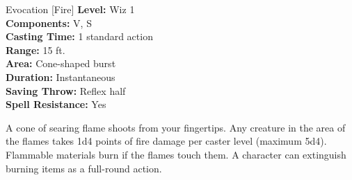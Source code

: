 {Evocation [Fire]}
{
	\textbf{Level:}
	Wiz 1\\
	\textbf{Components:}
	V, S\\
	\textbf{Casting Time:}
	1 standard action\\
	\textbf{Range:}
	15 ft.\\
	\textbf{Area:}
	Cone-shaped burst\\
	\textbf{Duration:}
	Instantaneous\\
	\textbf{Saving Throw:}
	Reflex half\\
	\textbf{Spell Resistance:}
	Yes\\
}
{
	A cone of searing flame shoots from your fingertips. Any creature in the area of the flames takes 1d4 points of fire damage per caster level (maximum 5d4). Flammable materials burn if the flames touch them. A character can extinguish burning items as a full-round action.

}
